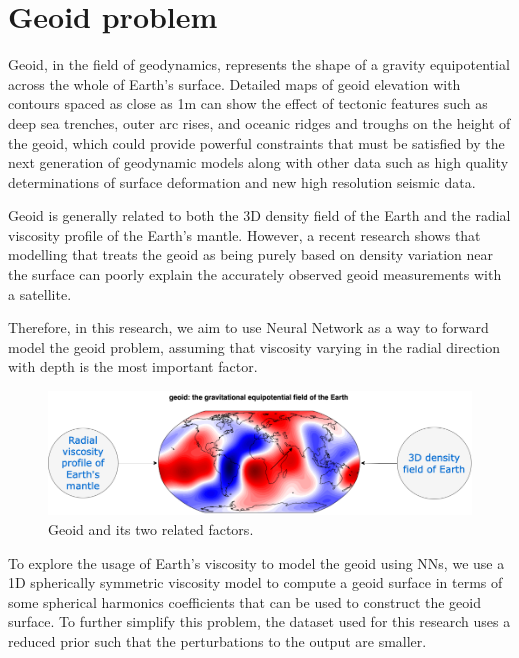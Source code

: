 \chapter{Geoid problem}\label{chap:content}

Geoid, in the field of geodynamics, represents the shape of a gravity equipotential across the whole of Earth's surface. Detailed maps of geoid elevation with contours spaced as close as 1m can show the effect of tectonic features such as deep sea trenches, outer arc rises, and oceanic ridges and troughs on the height of the geoid, which could provide powerful constraints that must be satisfied by the next generation of geodynamic models along with other data such as high quality determinations of surface deformation and new high resolution seismic data. \citep{10.1038_299104a0}

Geoid is generally related to both the 3D density field of the Earth and the radial viscosity profile of the Earth's mantle. However, a recent research shows that modelling that treats the geoid as being purely based on density variation near the surface can poorly explain the accurately observed geoid measurements with a satellite. \cite{10.1098_rsta.1989.0038}

Therefore, in this research, we aim to use Neural Network as a way to forward model the geoid problem,
assuming that viscosity varying in the radial direction with depth is the most important factor.

\begin{figure}[H]
    \centering
    \includegraphics[scale=0.4]{figures/geoid_images/Geoid.png}
    \caption{Geoid and its two related factors.}
\end{figure}

To explore the usage of Earth’s viscosity to model the geoid using NNs, we use a 1D spherically symmetric viscosity model to compute a geoid surface in terms of some spherical harmonics coefficients that can be used to construct the geoid surface. To further simplify this problem, the dataset used for this research uses a reduced prior such that the perturbations to the output are smaller.



